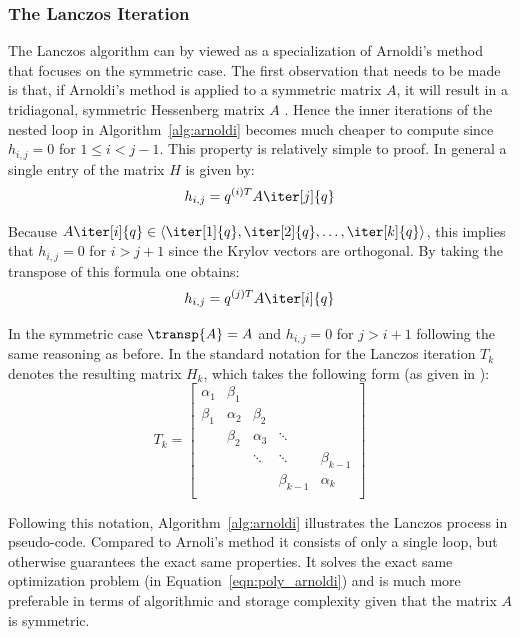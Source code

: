 \subsubsection{The Lanczos Iteration}
\label{sec:lanczos}

The Lanczos algorithm can by viewed as a specialization of Arnoldi's method that focuses on the symmetric case. The first observation that needs to be made is that, if Arnoldi's method is applied to a symmetric matrix $A$, it will result in a tridiagonal, symmetric Hessenberg matrix $A$ \cite{saad_gmres_1986}. Hence the inner iterations of the nested loop in Algorithm~\hyperref[alg:arnoldi]{\ref{alg:arnoldi}} becomes much cheaper to compute since $h_{i,j} = 0$ for $1 \leq i < j-1$. This property is relatively simple to proof. In general a single entry of the matrix $H$ is given by:
\begin{equation}
    h_{i,j}=q^{(i)T} A\iter[j]{q}
\end{equation}

\noindent Because $A\iter[i]{q} \in \langle \iter[1]{q},\iter[2]{q}, \dots , \iter[k]{q}\rangle $, this implies that $h_{i,j} = 0$ for $i>j+1$ since the Krylov vectors are orthogonal. By taking the transpose of this formula one obtains:
\begin{equation}
        h_{i,j}=q^{(j)T} A\iter[i]{q}
\end{equation}

\noindent In the symmetric case $\transp{A} = A$ and $h_{i,j} = 0$ for $j>i+1$ following the same reasoning as before. In the standard notation for the Lanczos iteration $T_k$ denotes the resulting matrix $H_k$, which takes the following form (as given in \cite{trefethen_numerical_1997}):
\begin{equation}
   T_k = \left[
    \begin{array}{ccccc}
      \alpha_1 & \beta_1 & & & \\
      \beta_1 & \alpha_2 & \beta_2  & & \\
      & \beta_2 & \alpha_3 & \ddots  & \\
       & &\ddots &\ddots &\beta_{k-1} \\
       & & &\beta_{k-1} &\alpha_{k} \\
    \end{array}
  \right] 
\end{equation}

\noindent Following this notation, Algorithm~\hyperref[alg:arnoldi]{\ref{alg:arnoldi}} illustrates the Lanczos process in pseudo-code. Compared to Arnoli's method it consists of only a single loop, but otherwise guarantees the exact same properties. It solves the exact same optimization problem (in Equation~\hyperref[eqn:poly_arnoldi]{\ref{eqn:poly_arnoldi}}) and is much more preferable in terms of algorithmic and storage complexity given that the matrix $A$ is symmetric. 


